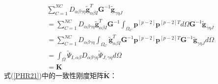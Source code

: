 \begin{equation}
\begin{split}
    &\sum_{C=1}^{N\!C}D_{\alpha\beta\gamma\eta}\tilde{\pmb g}_{\alpha\beta I}^T\pmb G^{-1}\tilde{\pmb g}_{\gamma\eta J}\\
    &=\sum_{C=1}^{N\!C}D_{\alpha\beta\gamma\eta}\tilde{\pmb g}_{\alpha\beta I}^T\pmb G^{-1}\int_{\Omega_C}\pmb{p}^{[p-2]}\pmb{p}^{[p-2]T}d\Omega\pmb G^{-1}\tilde{\pmb g}_{\gamma\eta J}\\
    &=\sum_{C=1}^{N\!C}D_{\alpha\beta\gamma\eta}\int_{\Omega_C}\tilde{\pmb g}_{\alpha\beta I}^T\pmb G^{-1}\pmb{p}^{[p-2]}\pmb{p}^{[p-2]T}\pmb G^{-1}\tilde{\pmb g}_{\gamma\eta J}d\Omega \\
    &=\int_{\Omega}\tilde{\Psi}_{I,\alpha\beta}D_{\alpha\beta\gamma\eta}\tilde{\Psi}_{J,\gamma\eta}d\Omega \\
    &=\pmb{K}
\end{split}
\end{equation}
\newpage
式(\ref{PHR21})中的一致性刚度矩阵$\tilde{\pmb{K}}$：
